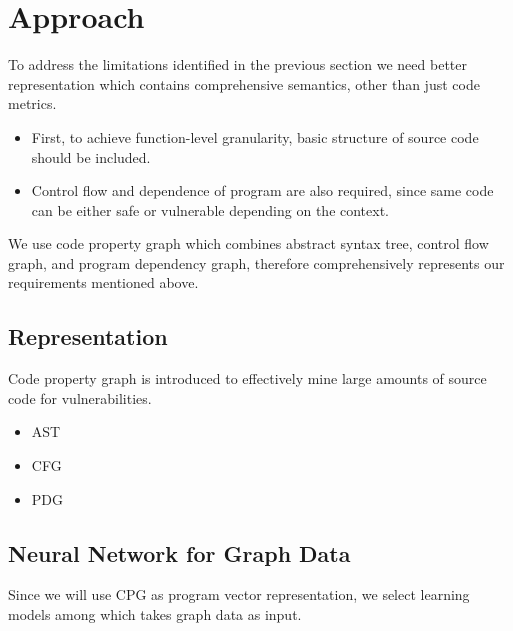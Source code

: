 \section{Approach}

To address the limitations identified in the previous section we need better representation which contains comprehensive semantics, other than just code metrics.

\begin{itemize}
\item
First, to achieve function-level granularity, basic structure of source code should be included.

\item
Control flow and dependence of program are also required, since same code can be either safe or vulnerable depending on the context.
\end{itemize}

We use code property graph which combines abstract syntax tree, control flow graph, and program dependency graph,
therefore comprehensively represents our requirements mentioned above.

\subsection{Representation}

Code property graph is introduced to effectively mine large amounts of source code for vulnerabilities.

\begin{itemize}
\item
AST
\item
CFG
\item
PDG
\end{itemize}
\subsection{Neural Network for Graph Data}

Since we will use CPG as program vector representation, we select learning models among which takes graph data as input.

